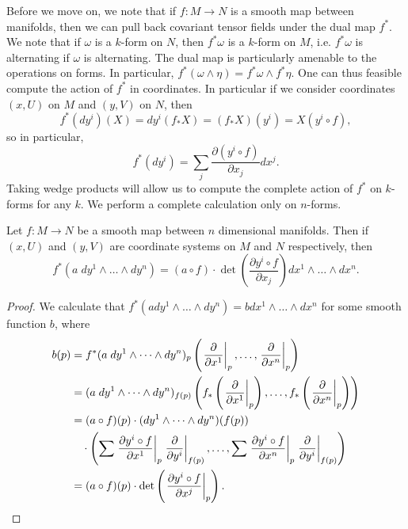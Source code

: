 Before we move on, we note that if $f: M \to N$ is a smooth map between manifolds, then we can pull back covariant tensor fields under the dual map $f^*$. We note that if $\omega$ is a $k$-form on $N$, then $f^* \omega$ is a $k$-form on $M$, i.e. $f^* \omega$ is alternating if $\omega$ is alternating. The dual map is particularly amenable to the operations on forms. In particular, $f^*(\omega \wedge \eta) = f^*\omega \wedge f^* \eta$. One can thus feasible compute the action of $f^*$ in coordinates. In particular if we consider coordinates $(x,U)$ on $M$ and $(y,V)$ on $N$, then
%
\[ f^*(dy^i)(X) = dy^i(f_* X) = (f_* X)(y^i) = X(y^i \circ f), \]
%
so in particular,
%
\[ f^*(dy^i) = \sum_j \frac{\partial (y^i \circ f)}{\partial x_j} dx^j. \]
%
Taking wedge products will allow us to compute the complete action of $f^*$ on $k$-forms for any $k$. We perform a complete calculation only on $n$-forms.

\begin{lemma}
    Let $f: M \to N$ be a smooth map between $n$ dimensional manifolds. Then if $(x,U)$ and $(y,V)$ are coordinate systems on $M$ and $N$ respectively, then
    \[ f^*(a\; dy^1 \wedge \dots \wedge dy^n) = (a \circ f) \cdot \det \left( \frac{\partial y^i \circ f}{\partial x_j} \right) dx^1 \wedge \dots \wedge dx^n. \]
\end{lemma}
\begin{proof}
    We calculate that $f^*(a dy^1 \wedge \dots \wedge dy^n) = b dx^1 \wedge \dots \wedge dx^n$ for some smooth function $b$, where
    \begin{align*}
        b(p) &= f^*(a\; dy^1 \wedge \dots \wedge dy^n)_p \left( \left. \frac{\partial}{\partial x^1} \right|_p, \dots, \left. \frac{\partial}{\partial x^n} \right|_p \right)\\
        &= (a\; dy^1 \wedge \dots \wedge dy^n)_{f(p)} \left(f_*\left( \left. \frac{\partial}{\partial x^1} \right|_p \right), \dots, f_* \left( \left. \frac{\partial}{\partial x^n} \right|_p \right) \right)\\
        &= (a \circ f)(p) \cdot (dy^1 \wedge \dots \wedge dy^n)(f(p)) \\
        &\ \ \ \cdot \left( \sum \left. \frac{\partial y^i \circ f}{\partial x^1} \right|_p \left. \frac{\partial}{\partial y^i} \right|_{f(p)}, \dots, \sum \left. \frac{\partial y^i \circ f}{\partial x^n} \right|_p \left. \frac{\partial}{\partial y^i} \right|_{f(p)} \right)\\
        &= (a \circ f)(p) \cdot \det \left( \left. \frac{\partial y^i \circ f}{\partial x^j} \right|_p \right). \qedhere
    \end{align*}
\end{proof}

